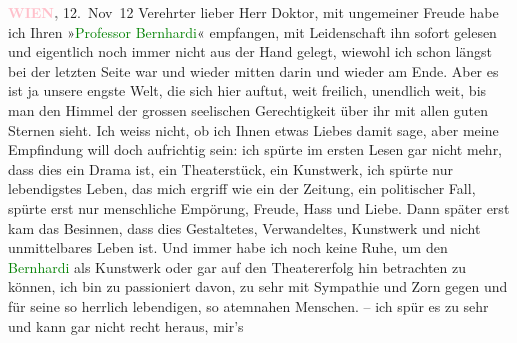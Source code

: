 \pstart
           \raggedleft{}\textcolor{gray}{\textbf{\textcolor{pink}{WIEN}\ledrightnote{\textcolor{pink}{Wien}},}}{ }12. Nov 12\pend
           {\vspace{1\baselineskip}}
\pstart{}Verehrter lieber Herr Doktor,\pend\vspace{0.5em}
\pstart
            mit ungemeiner Freude habe ich Ihren »\textcolor{green}{Professor
                        Bernhardi}\ledrightnote{\textcolor{green}{Professor Bernhardi. Komödie in fünf Akten}}« empfangen, mit Leidenschaft ihn sofort gelesen und
                    eigentlich noch immer nicht aus der Hand gelegt, wiewohl ich schon längst bei
                    der letzten Seite war und wieder mitten darin und wieder am Ende. Aber es ist ja
                    unsere engste Welt, die sich hier auftut, weit freilich, unendlich weit, bis man
                    den Himmel der grossen seelischen Gerechtigkeit über ihr mit allen guten Sternen
                    sieht. Ich weiss nicht, ob ich Ihnen etwas Liebes damit sage, aber meine
                    Empfindung will doch aufrichtig sein: {\pb}ich spürte im ersten Lesen gar
                    nicht mehr, dass dies ein Drama ist, ein Theaterstück, ein Kunstwerk, ich spürte
                    nur lebendigstes Leben, das mich ergriff wie ein \label{K_L03639-1v}\label{K_L03639-1} der Zeitung, ein politischer Fall, spürte erst
                    nur menschliche Empörung, Freude, Hass und Liebe. Dann später erst kam das
                    Besinnen, dass dies Gestaltetes, Verwandeltes, Kunstwerk und nicht unmittelbares
                    Leben ist. Und  immer habe ich noch keine
                    Ruhe, um den \textcolor{green}{Bernhardi}\ledrightnote{\textcolor{green}{Professor Bernhardi. Komödie in fünf Akten}} als Kunstwerk oder
                    gar auf den Theatererfolg hin betrachten zu können, ich bin zu passioniert
                    davon, zu sehr mit Sympathie und Zorn gegen und für seine so herrlich
                    lebendigen, so atemnahen Menschen. \label{K_L03639-2v}\label{K_L03639-2} – ich spür es zu sehr und {\pb}kann gar nicht recht heraus, mir's
